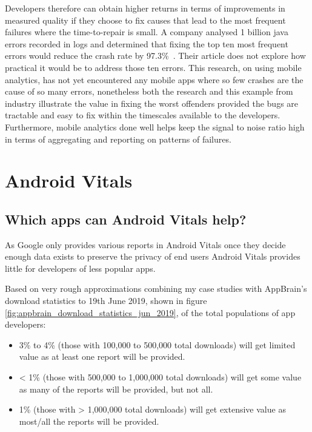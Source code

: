 Developers therefore can obtain higher returns in terms of improvements in measured quality if they choose to fix causes that lead to the most frequent failures where the time-to-repair is small. A company analysed 1 billion java errors recorded in logs and determined that fixing the top ten most frequent errors would reduce the crash rate by 97.3\%~\citep{overops2021_what_causes_97pct_of_1billion_java_logged_errors}. Their article does not explore how practical it would be to address those ten errors. This research, on using mobile analytics, has not yet encountered any mobile apps where so few crashes are the cause of so many errors, nonetheless both the research and this example from industry illustrate the value in fixing the worst offenders provided the bugs are tractable and easy to fix within the timescales available to the developers. Furthermore, mobile analytics done well helps keep the signal to noise ratio high in terms of aggregating and reporting on patterns of failures.

\section{Android Vitals}
\subsection{Which apps can Android Vitals help?}
As Google only provides various reports in Android Vitals once they decide enough data exists to preserve the privacy of end users Android Vitals provides little for developers of less popular apps. 

Based on very rough approximations combining my case studies with AppBrain's download statistics to 19th June 2019, shown in figure \ref{fig:appbrain_download_statistics_jun_2019}\cite{appbrain_download_statistics_june_2019}, of the total populations of app developers:
\begin{itemize}
    \item 3\% to 4\% (those with 100,000 to 500,000 total downloads) will get limited value as at least one report will be provided.
    \item < 1\% (those with 500,000 to 1,000,000 total downloads) will get some value as many of the reports will be provided, but not all.
    \item 1\% (those with > 1,000,000 total downloads) will get extensive value as most/all the reports will be provided.
\end{itemize}

